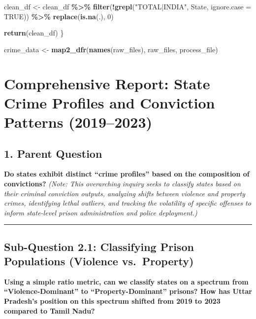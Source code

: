 \documentclass[
]{article}
\newenvironment{Shaded}{\begin{snugshade}}{\end{snugshade}}
\newcommand{\AttributeTok}[1]{\textcolor[rgb]{0.13,0.29,0.53}{#1}}
\newcommand{\ConstantTok}[1]{\textcolor[rgb]{0.56,0.35,0.01}{#1}}
\newcommand{\DecValTok}[1]{\textcolor[rgb]{0.00,0.00,0.81}{#1}}
\newcommand{\FunctionTok}[1]{\textcolor[rgb]{0.13,0.29,0.53}{\textbf{#1}}}
\newcommand{\NormalTok}[1]{#1}
\newcommand{\OtherTok}[1]{\textcolor[rgb]{0.56,0.35,0.01}{#1}}
\newcommand{\SpecialCharTok}[1]{\textcolor[rgb]{0.81,0.36,0.00}{\textbf{#1}}}
\newcommand{\StringTok}[1]{\textcolor[rgb]{0.31,0.60,0.02}{#1}}
\begin{document}
\begin{Shaded}
\begin{Highlighting}[]
\NormalTok{  clean\_df }\OtherTok{\textless{}{-}}\NormalTok{ clean\_df }\SpecialCharTok{\%\textgreater{}\%}
    \FunctionTok{filter}\NormalTok{(}\SpecialCharTok{!}\FunctionTok{grepl}\NormalTok{(}\StringTok{"TOTAL|INDIA"}\NormalTok{, State, }\AttributeTok{ignore.case =} \ConstantTok{TRUE}\NormalTok{)) }\SpecialCharTok{\%\textgreater{}\%}
    \FunctionTok{replace}\NormalTok{(}\FunctionTok{is.na}\NormalTok{(.), }\DecValTok{0}\NormalTok{)}
  
  \FunctionTok{return}\NormalTok{(clean\_df)}
\NormalTok{\}}

\NormalTok{crime\_data }\OtherTok{\textless{}{-}} \FunctionTok{map2\_dfr}\NormalTok{(}\FunctionTok{names}\NormalTok{(raw\_files), raw\_files, process\_file)}
\end{Highlighting}
\end{Shaded}

\section{Comprehensive Report: State Crime Profiles and Conviction
Patterns
(2019--2023)}\label{comprehensive-report-state-crime-profiles-and-conviction-patterns-20192023}

\subsection{1. Parent Question}\label{parent-question}

\textbf{Do states exhibit distinct ``crime profiles'' based on the
composition of convictions?} \emph{(Note: This overarching inquiry seeks
to classify states based on their criminal conviction outputs, analyzing
shifts between violence and property crimes, identifying lethal
outliers, and tracking the volatility of specific offenses to inform
state-level prison administration and police deployment.)}

\begin{center}\rule{0.5\linewidth}{0.5pt}\end{center}

\subsection{Sub-Question 2.1: Classifying Prison Populations (Violence
vs.~Property)}\label{sub-question-2.1-classifying-prison-populations-violence-vs.-property}

\textbf{Using a simple ratio metric, can we classify states on a
spectrum from ``Violence-Dominant'' to ``Property-Dominant'' prisons?
How has Uttar Pradesh's position on this spectrum shifted from 2019 to
2023 compared to Tamil Nadu?}
\end{document}
